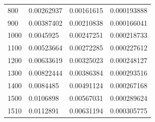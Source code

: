 \begin{center}
\begin{longtable}{l|l|l|l}
800                                                    & 0.00262937                                                        & 0.00161615                                               & 0.000193888                                                        \\
900                                                    & 0.00387402                                                        & 0.00210838                                               & 0.000166041                                                        \\
1000                                                   & 0.0045925                                                         & 0.00247251                                               & 0.000218733                                                        \\
1100                                                   & 0.00523664                                                        & 0.00272285                                               & 0.000227612                                                        \\
1200                                                   & 0.00633619                                                        & 0.00325023                                               & 0.000248127                                                        \\
1300                                                   & 0.00822444                                                        & 0.00386384                                               & 0.000293516                                                        \\
1400                                                   & 0.0084485                                                         & 0.00491124                                               & 0.000267168                                                        \\
1500                                                   & 0.0106898                                                         & 0.00567031                                               & 0.000289624                                                        \\
1510                                                   & 0.0112891                                                         & 0.00631194                                               & 0.000305775                                                        \\

\end{longtable}
\end{center}
